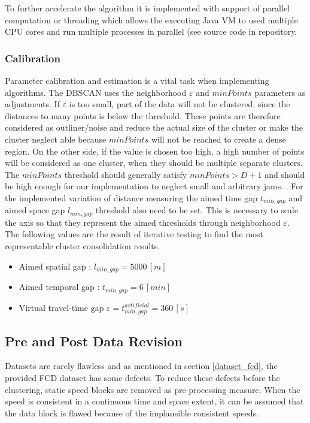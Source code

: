 To further accelerate the algorithm it is implemented with support of parallel computation or threading which allows the executing Java VM to used multiple CPU cores and run multiple processes in parallel (see source code in repository.

\subsubsection{Calibration}
Parameter calibration and estimation is a vital task when implementing algorithms. The DBSCAN uses the neighborhood $\varepsilon$ and $minPoints$ parameters as adjustments. If $\varepsilon$ is too small, part of the data will not be clustered, since the distances to many points is below the threshold. These points are therefore considered as outliner/noise and reduce the actual size of the cluster or make the cluster neglect able because $minPoints$ will not be reached to create a dense region. On the other side, if the value is chosen too high, a high number of points will be considered as one cluster, when they should be multiple separate clusters. The $minPoints$ threshold should generally satisfy $minPoints > D + 1$ and should be high enough for our implementation to neglect small and arbitrary jams. \parencite{Padro2017}. For the implemented variation of distance measuring the aimed time gap $t_{min,gap}$ and aimed space gap $l_{min,gap}$ threshold also need to be set. This is necessary to scale the axis so that they represent the aimed thresholds through neighborhood $\varepsilon$. The following values are the result of iterative testing to find the most representable cluster consolidation results. 

\begin{itemize}
	\item Aimed spatial gap : $l_{min,gap} = 5000 \,[m]$
	\item Aimed temporal gap : $t_{min,gap} = 6 \,[min]$
	\item Virtual travel-time gap $\varepsilon = t_{min,gap}^{artificial} = 360 \,[s]$
\end{itemize}

\subsection{Pre and Post Data Revision}
Datasets are rarely flawless and as mentioned in section \ref{dataset_fcd}, the provided FCD dataset has some defects. To reduce these defects before the clustering, static speed blocks are removed as pre-processing measure. When the speed is consistent in a continuous time and space extent, it can be assumed that the data block is flawed because of the implausible consistent speeds.

